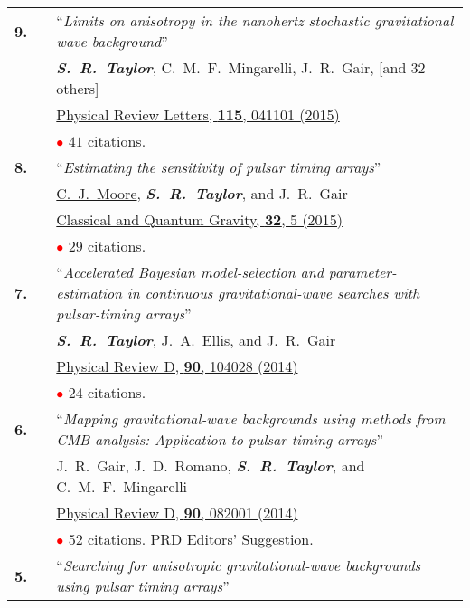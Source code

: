 \documentclass[11pt,letterpaper,sans]{moderncv}
\begin{document}
{\begin{longtable}{rp{0.3cm}p{15.8cm}}
\textbf{9.} & & ``\textit{Limits on anisotropy in the nanohertz stochastic gravitational wave background}'' \\ 
&& \textit{\textbf{S.~R.~Taylor}}, C.~M.~F.~Mingarelli, J.~R.~Gair, [and 32 others] \\ 
&& \href{http://journals.aps.org/prl/abstract/10.1103/PhysRevLett.115.041101}{{\color{color1} Physical Review Letters, \textbf{115}, 041101 (2015)}} \\
&& \textcolor{red}{$\bullet$} $41$ citations. \vspace{0.09cm}\\
\textbf{8.} & & ``\textit{Estimating the sensitivity of pulsar timing arrays}'' \\ 
&& \underline{C.~J.~Moore}, \textit{\textbf{S.~R.~Taylor}}, and J.~R.~Gair \\ 
&& \href{http://iopscience.iop.org/article/10.1088/0264-9381/32/5/055004/meta}{{\color{color1} Classical and Quantum Gravity, \textbf{32}, 5 (2015)}} \\
&& \textcolor{red}{$\bullet$} $29$ citations. \vspace{0.09cm}\\
\textbf{7.} & & ``\textit{Accelerated Bayesian model-selection and parameter-estimation in continuous gravitational-wave searches with pulsar-timing arrays}'' \\ 
&& \textit{\textbf{S.~R.~Taylor}}, J.~A.~Ellis, and J.~R.~Gair \\ 
&& \href{http://journals.aps.org/prd/abstract/10.1103/PhysRevD.90.104028}{{\color{color1} Physical Review D, \textbf{90}, 104028 (2014)}} \\
&& \textcolor{red}{$\bullet$} $24$ citations. \vspace{0.09cm}\\
\textbf{6.} & & ``\textit{Mapping gravitational-wave backgrounds using methods from CMB analysis: Application to pulsar timing arrays}'' \\ 
&& J.~R.~Gair, J.~D.~Romano, \textit{\textbf{S.~R.~Taylor}}, and C.~M.~F.~Mingarelli \\ 
&& \href{http://journals.aps.org/prd/abstract/10.1103/PhysRevD.90.082001}{{\color{color1} Physical Review D, \textbf{90}, 082001 (2014)}} \\
&& \textcolor{red}{$\bullet$} $52$ citations. PRD Editors' Suggestion.\vspace{0.09cm}\\
\textbf{5.} & & ``\textit{Searching for anisotropic gravitational-wave backgrounds using pulsar timing arrays}'' \\ 

\end{longtable}}
\end{document}
